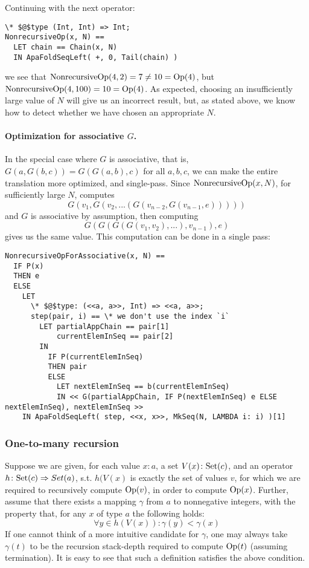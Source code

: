 Continuing with the next operator:
\begin{lstlisting}[language=tla,columns=fullflexible]
\* $@$type (Int, Int) => Int;
NonrecursiveOp(x, N) ==
  LET chain == Chain(x, N)
  IN ApaFoldSeqLeft( +, 0, Tail(chain) )
\end{lstlisting}
%
we see that $\mathrm{NonrecursiveOp}(4, 2) = 7 \ne 10 = \mathrm{Op}(4)$, but $\mathrm{NonrecursiveOp}(4, 100) = 10 = \mathrm{Op}(4)$.
As expected, choosing an insufficiently large value of $N$ will give us an incorrect result, but, as stated above, we know how to detect whether we have chosen an appropriate $N$.

\paragraph{ Optimization for associative $G$.}
In the special case where $G$ is associative, that is, $G(a, G(b, c)) = G(G(a, b), c)$ for all $a,b,c$, we can make the entire translation more optimized, and single-pass. Since $\mathrm{NonrecursiveOp}(x,N)$, for sufficiently large $N$, computes 
\[
G(v_1, G(v_2, ... (G(v_{n-2}, G(v_{n-1}, e)))))
\]
%
and $G$ is associative by assumption, then computing
\[
G(G(G(G(v_1, v_2), ...), v_{n-1}), e)
\]
gives us the same value. This computation can be done in a single pass:
\begin{lstlisting}[language=tla,columns=fullflexible]
NonrecursiveOpForAssociative(x, N) ==
  IF P(x)
  THEN e
  ELSE
    LET 
      \* $@$type: (<<a, a>>, Int) => <<a, a>>;
      step(pair, i) == \* we don't use the index `i`
        LET partialAppChain == pair[1]
            currentElemInSeq == pair[2]
        IN
          IF P(currentElemInSeq)
          THEN pair
          ELSE
            LET nextElemInSeq == b(currentElemInSeq)
            IN << G(partialAppChain, IF P(nextElemInSeq) e ELSE nextElemInSeq), nextElemInSeq >>
    IN ApaFoldSeqLeft( step, <<x, x>>, MkSeq(N, LAMBDA i: i) )[1]
\end{lstlisting}

\subsubsection{One-to-many recursion}

Suppose we are given, for each value $x: a$, a set $V(x)\colon \mathrm{Set}(c)$, and an operator $h\colon \mathrm{Set}(c) \Rightarrow Set(a)$, s.t. $h(V(x)$ is exactly the set of values $v$, for which we are required to recursively compute $\mathrm{Op}(v)$, in order to compute $\mathrm{Op}(x)$. 
Further, assume that there exists a mapping $\gamma$ from $a$ to nonnegative integers, with the property that, for any $x$ of type $a$ the following holds:
\[
\forall y \in h(V(x))\colon \gamma(y) < \gamma(x) 
\]
%
If one cannot think of a more intuitive candidate for $\gamma$, one may always take $\gamma(t)$ to be the recursion stack-depth required to compute $\mathrm{Op}(t)$ (assuming termination). It is easy to see that such a definition satisfies the above condition.

